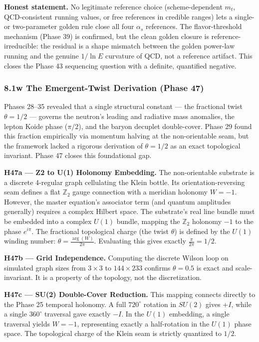 \documentclass[
]{article}
\begin{document}
\textbf{Honest statement.} No legitimate reference choice
(scheme-dependent \(m_t\), QCD-consistent running values, or free
references in credible ranges) lets a single- or two-parameter golden
rule close all four \(\alpha_s\) references. The flavor-threshold
mechanism (Phase 39) is confirmed, but the clean golden closure is
reference-irreducible: the residual is a shape mismatch between the
golden power-law running and the genuine \(1/\ln E\) curvature of QCD,
not a reference artifact. This closes the Phase 43 sequencing question
with a definite, quantified negative.

\subsubsection{8.1w The Emergent-Twist Derivation (Phase
47)}\label{w-the-emergent-twist-derivation-phase-47}

Phases 28--35 revealed that a single structural constant --- the
fractional twist \(\theta = 1/2\) --- governs the neutron's leading and
radiative mass anomalies, the lepton Koide phase (\(\pi/2\)), and the
baryon decuplet double-cover. Phase 29 found this fraction empirically
via momentum halving at the non-orientable seam, but the framework
lacked a rigorous derivation of \(\theta = 1/2\) as an exact topological
invariant. Phase 47 closes this foundational gap.

\textbf{H47a --- Z2 to U(1) Holonomy Embedding.} The non-orientable
substrate is a discrete 4-regular graph cellulating the Klein bottle.
Its orientation-reversing seam defines a flat \(\mathbb{Z}_2\) gauge
connection with a meridian holonomy \(W = -1\). However, the master
equation's associator term (and quantum amplitudes generally) requires a
complex Hilbert space. The substrate's real line bundle must be embedded
into a complex \(U(1)\) bundle, mapping the \(\mathbb{Z}_2\) holonomy
\(-1\) to the phase \(e^{i\pi}\). The fractional topological charge (the
twist \(\theta\)) is defined by the \(U(1)\) winding number:
\(\theta = \frac{\arg(W)}{2\pi}\). Evaluating this gives exactly
\(\frac{\pi}{2\pi} = 1/2\).

\textbf{H47b --- Grid Independence.} Computing the discrete Wilson loop
on simulated graph sizes from \(3\times3\) to \(144\times233\) confirms
\(\theta = 0.5\) is exact and scale-invariant. It is a property of the
topology, not the discretization.

\textbf{H47c --- SU(2) Double-Cover Reduction.} This mapping connects
directly to the Phase 25 temporal holonomy. A full \(720^\circ\)
rotation in \(SU(2)\) gives \(+I\), while a single \(360^\circ\)
traversal gave exactly \(-I\). In the \(U(1)\) embedding, a single
traversal yields \(W = -1\), representing exactly a half-rotation in the
\(U(1)\) phase space. The topological charge of the Klein seam is
strictly quantized to \(1/2\).
\end{document}
